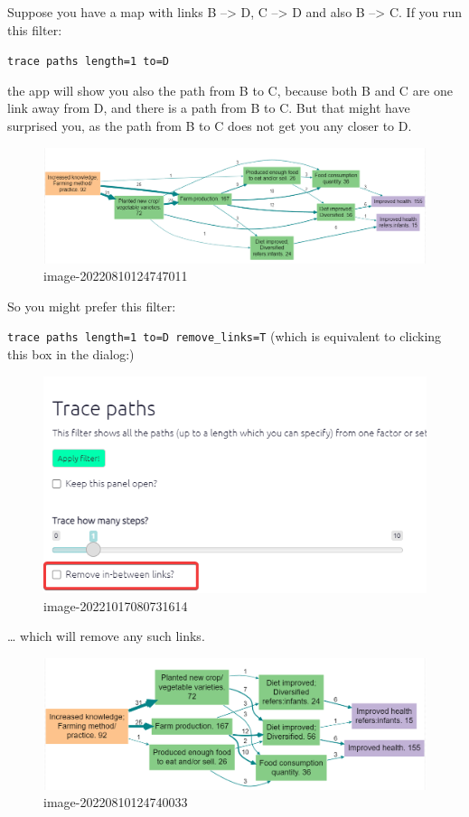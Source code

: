 \documentclass[
]{book}
\begin{document}
Suppose you have a map with links B --\textgreater{} D, C --\textgreater{} D and also B --\textgreater{} C. If you run this filter:

\texttt{trace\ paths\ length=1\ to=D}

the app will show you also the path from B to C, because both B and C are one link away from D, and there is a path from B to C. But that might have surprised you, as the path from B to C does not get you any closer to D.

\begin{figure}
\centering
\includegraphics{_assets/image-20220810124747011.png}
\caption{image-20220810124747011}
\end{figure}

So you might prefer this filter:

\texttt{trace\ paths\ length=1\ to=D\ remove\_links=T} (which is equivalent to clicking this box in the dialog:)

\begin{figure}
\centering
\includegraphics{_assets/image-20221017080731614.png}
\caption{image-20221017080731614}
\end{figure}

\ldots{} which will remove any such links.

\begin{figure}
\centering
\includegraphics{_assets/image-20220810124740033.png}
\caption{image-20220810124740033}
\end{figure}
\end{document}
